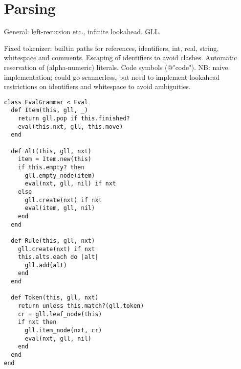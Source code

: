 
\section{Parsing}

General: left-recursion etc., infinite lookahead. GLL. 

Fixed tokenizer: builtin paths for references, identifiers, int, real,
string, whitespace and comments. Escaping of identifiers to avoid
clashes. Automatic reservation of (alpha-numeric) literals. Code
symbols (@"code"). NB: naive implementation; could go scannerless, but
need to implement lookahead restrictions on identifiers and whitespace
to avoid ambiguities.

\begin{verbatim}
class EvalGrammar < Eval
  def Item(this, gll, _)
    return gll.pop if this.finished?
    eval(this.nxt, gll, this.move)
  end

  def Alt(this, gll, nxt)
    item = Item.new(this)
    if this.empty? then
      gll.empty_node(item)
      eval(nxt, gll, nil) if nxt
    else
      gll.create(nxt) if nxt
      eval(item, gll, nil)
    end
  end
  
  def Rule(this, gll, nxt)
    gll.create(nxt) if nxt
    this.alts.each do |alt|
      gll.add(alt)
    end
  end

  def Token(this, gll, nxt)
    return unless this.match?(gll.token)
    cr = gll.leaf_node(this)
    if nxt then
      gll.item_node(nxt, cr)
      eval(nxt, gll, nil)
    end
  end
end
\end{verbatim}

